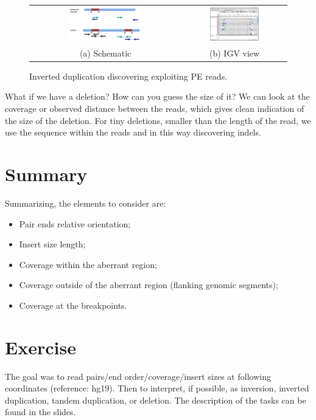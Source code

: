 \begin{figure}[H]
\begin{tabular}{cc}
  \includegraphics[width=0.5\textwidth]{inverted.png} &   \includegraphics[width=0.5\textwidth]{inverted_igv.png} \\
(a) Schematic & (b) IGV view \\[6pt]
\end{tabular}
\caption{Inverted duplication discovering exploiting PE reads.}
\label{fig:inverted}
\end{figure}

What if we have a deletion? How can you guess the size of it? We can look at the coverage or observed distance between the reads, which gives clean indication of the size of the deletion. For tiny deletions, smaller than the length of the read, we use the sequence within the reads and in this way discovering indels.

\section{Summary}
Summarizing, the elements to consider are:
 \begin{itemize}
 \item Pair ends relative orientation;
 \item Insert size length;
\item Coverage within the aberrant region;
\item Coverage outside of the aberrant region (flanking genomic segments);
\item Coverage at the breakpoints.
 \end{itemize}

\section{Exercise}
The goal was to read pairs/end order/coverage/insert sizes at following
coordinates (reference: hg19). Then to interpret, if possible, as inversion, inverted duplication, tandem duplication, or deletion. The description of the tasks can be found in the slides.

